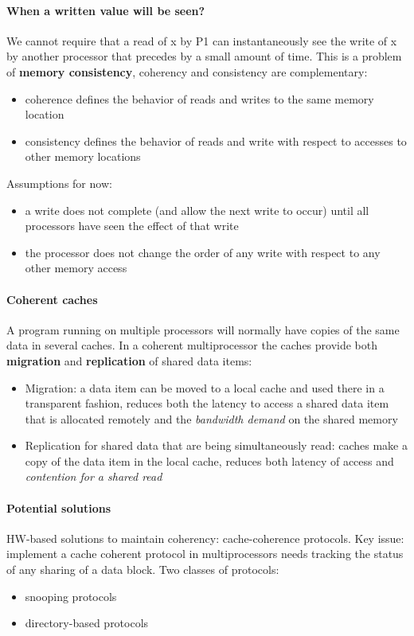 \paragraph{When a written value will be seen?}
We cannot require that a read of x by P1 can
instantaneously see the write of x by another
processor that precedes by a small amount of time.
This is a problem of \textbf{memory consistency}, coherency and consistency are complementary:
\begin{itemize}
    \item coherence defines the behavior of reads and writes to the same memory location
    \item consistency defines the behavior of reads and write with respect to accesses to other memory locations
\end{itemize}
Assumptions for now:
\begin{itemize}
    \item a write does not complete (and allow the next write to occur) until all processors have seen the effect of
    that write
    \item the processor does not change the order of any write with respect to any other memory access
\end{itemize}

\paragraph{Coherent caches}
A program running on multiple processors will normally
have copies of the same data in several caches.
In a coherent multiprocessor the caches provide both
\textbf{migration} and \textbf{replication} of shared data items:
\begin{itemize}
    \item Migration: a data item can be moved to a local cache
    and used there in a transparent fashion, reduces both the latency to access a shared data item that
    is allocated remotely and the \textit{bandwidth demand} on the shared memory
    \item Replication for shared data that are being
    simultaneously read: caches make a copy of the data
    item in the local cache, reduces both latency of access and \textit{contention for a shared read}
\end{itemize}

\paragraph{Potential solutions} HW-based solutions to maintain coherency: cache-coherence protocols.
Key issue: implement a cache coherent protocol in multiprocessors needs tracking the status of any sharing of a data
block.
Two classes of protocols:
\begin{itemize}
    \item snooping protocols
    \item directory-based protocols
\end{itemize}


